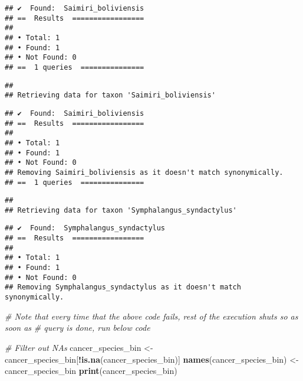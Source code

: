 \documentclass[
]{article}
\newenvironment{Shaded}{\begin{snugshade}}{\end{snugshade}}
\newcommand{\CommentTok}[1]{\textcolor[rgb]{0.56,0.35,0.01}{\textit{#1}}}
\newcommand{\FunctionTok}[1]{\textcolor[rgb]{0.13,0.29,0.53}{\textbf{#1}}}
\newcommand{\NormalTok}[1]{#1}
\newcommand{\OtherTok}[1]{\textcolor[rgb]{0.56,0.35,0.01}{#1}}
\newcommand{\SpecialCharTok}[1]{\textcolor[rgb]{0.81,0.36,0.00}{\textbf{#1}}}
\begin{document}
\begin{verbatim}
## ✔  Found:  Saimiri_boliviensis
## ==  Results  =================
## 
## • Total: 1 
## • Found: 1 
## • Not Found: 0
## ==  1 queries  ===============
\end{verbatim}

\begin{verbatim}
## 
## Retrieving data for taxon 'Saimiri_boliviensis'
\end{verbatim}

\begin{verbatim}
## ✔  Found:  Saimiri_boliviensis
## ==  Results  =================
## 
## • Total: 1 
## • Found: 1 
## • Not Found: 0
## Removing Saimiri_boliviensis as it doesn't match synonymically.
## ==  1 queries  ===============
\end{verbatim}

\begin{verbatim}
## 
## Retrieving data for taxon 'Symphalangus_syndactylus'
\end{verbatim}

\begin{verbatim}
## ✔  Found:  Symphalangus_syndactylus
## ==  Results  =================
## 
## • Total: 1 
## • Found: 1 
## • Not Found: 0
## Removing Symphalangus_syndactylus as it doesn't match synonymically.
\end{verbatim}

\begin{Shaded}
\begin{Highlighting}[]
\CommentTok{\# Note that every time that the above code fails, rest of the execution shuts so as soon as}
\CommentTok{\# query is done, run below code}

\CommentTok{\# Filter out NAs}
\NormalTok{cancer\_species\_bin }\OtherTok{\textless{}{-}}\NormalTok{ cancer\_species\_bin[}\SpecialCharTok{!}\FunctionTok{is.na}\NormalTok{(cancer\_species\_bin)]}
\FunctionTok{names}\NormalTok{(cancer\_species\_bin) }\OtherTok{\textless{}{-}}\NormalTok{ cancer\_species\_bin}
\FunctionTok{print}\NormalTok{(cancer\_species\_bin)}
\end{Highlighting}
\end{Shaded}
\end{document}
